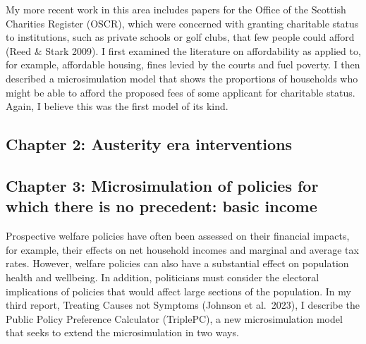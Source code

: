 \documentclass[
  letterpaper,
  DIV=11,
  numbers=noendperiod]{scrartcl}
\begin{document}
My more recent work in this area includes papers for the Office of the
Scottish Charities Register (OSCR), which were concerned with granting
charitable status to institutions, such as private schools or golf
clubs, that few people could afford (Reed \& Stark 2009). I first
examined the literature on affordability as applied to, for example,
affordable housing, fines levied by the courts and fuel poverty. I then
described a microsimulation model that shows the proportions of
households who might be able to afford the proposed fees of some
applicant for charitable status. Again, I believe this was the first
model of its kind.

\subsection{Chapter 2: Austerity era
interventions}\label{chapter-2-austerity-era-interventions}

\subsection{Chapter 3: Microsimulation of policies for which there is no
precedent: basic
income}\label{chapter-3-microsimulation-of-policies-for-which-there-is-no-precedent-basic-income}

Prospective welfare policies have often been assessed on their financial
impacts, for example, their effects on net household incomes and
marginal and average tax rates. However, welfare policies can also have
a substantial effect on population health and wellbeing. In addition,
politicians must consider the electoral implications of policies that
would affect large sections of the population. In my third report,
Treating Causes not Symptoms (Johnson et al.~2023), I describe the
Public Policy Preference Calculator (TriplePC), a new microsimulation
model that seeks to extend the microsimulation in two ways.
\end{document}
